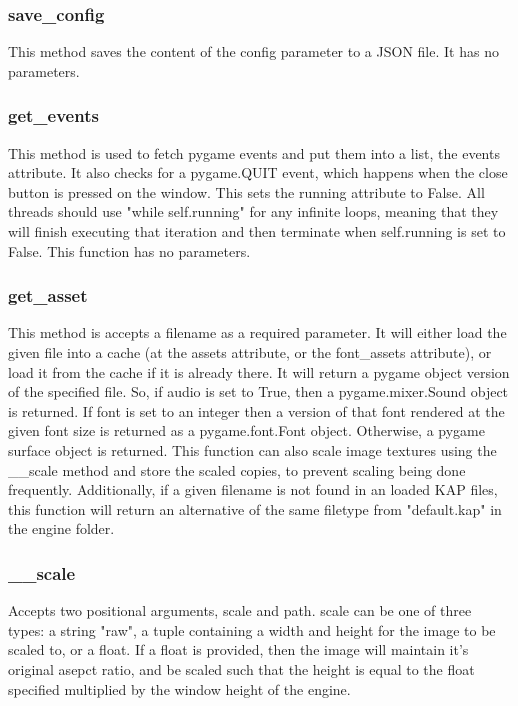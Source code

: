 \documentclass{report}
\begin{document}
\subsubsection{save\_config}

This method saves the content of the config parameter to a JSON file. It has no parameters.

\subsubsection{get\_events}

This method is used to fetch pygame events and put them into a list, the events attribute. It also checks for a pygame.QUIT event, which happens when the close button is pressed on the window. This sets the running attribute to False. All threads should use "while self.running" for any infinite loops, meaning that they will finish executing that iteration and then terminate when self.running is set to False. This function has no parameters.

\subsubsection{get\_asset}

This method is accepts a filename as a required parameter. It will either load the given file into a cache (at the assets attribute, or the font\_assets attribute), or load it from the cache if it is already there. It will return a pygame object version of the specified file. So, if audio is set to True, then a pygame.mixer.Sound object is returned. If font is set to an integer then a version of that font rendered at the given font size is returned as a pygame.font.Font object. Otherwise, a pygame surface object is returned. This function can also scale image textures using the \_\_scale method and store the scaled copies, to prevent scaling being done frequently. Additionally, if a given filename is not found in an loaded KAP files, this function will return an alternative of the same filetype from "default.kap" in the engine folder.

\subsubsection{\_\_scale}

Accepts two positional arguments, scale and path. scale can be one of three types: a string "raw", a tuple containing a width and height for the image to be scaled to, or a float. If a float is provided, then the image will maintain it's original asepct ratio, and be scaled such that the height is equal to the float specified multiplied by the window height of the engine.
\end{document}
